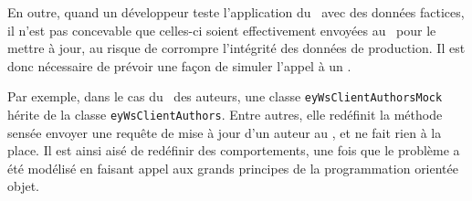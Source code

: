 En outre, quand un développeur teste l'application du \alotdeux\ avec des données factices, il n'est pas concevable que celles-ci soient effectivement envoyées au \alotun\ pour le mettre à jour, au risque de corrompre l'intégrité des données de production. Il est donc nécessaire de prévoir une façon de simuler l'appel à un \aws.

Par exemple, dans le cas du \aws\ des auteurs, une classe \texttt{ey\-Ws\-Client\-Authors\-Mock} hérite de la classe \texttt{eyWsClientAuthors}. Entre autres, elle redéfinit la méthode sensée envoyer une requête de mise à jour d'un auteur au \alotun, et ne fait rien à la place. Il est ainsi aisé de redéfinir des comportements, une fois que le problème a été modélisé en faisant appel aux grands principes de la programmation orientée objet.
